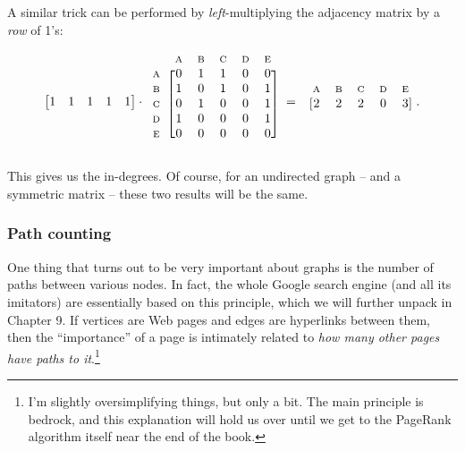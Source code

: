 \begin{alttitles}
A similar trick can be performed by \textit{left}-multiplying the adjacency
matrix by a \textit{row} of 1's:

\[
\begin{bmatrix}
1 & 1 & 1 & 1 & 1 \\
\end{bmatrix} \cdot
\begin{blockarray}{cccccc}
& {\scriptsize\textrm{A}} & {\scriptsize\textrm{B}} & {\scriptsize\textrm{C}} & {\scriptsize\textrm{D}} & {\scriptsize\textrm{E}} \\
\begin{block}{c[ccccc]}
{\scriptsize\textrm{A}} & 0 & 1 & 1 & 0 & 0 \\
{\scriptsize\textrm{B}} & 1 & 0 & 1 & 0 & 1 \\
{\scriptsize\textrm{C}} & 0 & 1 & 0 & 0 & 1 \\
{\scriptsize\textrm{D}} & 1 & 0 & 0 & 0 & 1 \\
{\scriptsize\textrm{E}} & 0 & 0 & 0 & 0 & 0 \\
\end{block}
\end{blockarray} \ =
\hspace*{-.1in}
\begin{blockarray}{cccccc}
& {\scriptsize\textrm{A}} & {\scriptsize\textrm{B}} & {\scriptsize\textrm{C}} & {\scriptsize\textrm{D}} & {\scriptsize\textrm{E}} \\
\begin{block}{c[ccccc]}
 & 2 & 2 & 2 & 0 & 3 \\
\end{block}
\end{blockarray}.
\]


This gives us the in-degrees. Of course, for an undirected graph -- and a
symmetric matrix -- these two results will be the same.


\subsubsection{Path counting}


One thing that turns out to be very important about graphs is the number of
paths between various nodes. In fact, the whole Google search engine (and all
its imitators) are essentially based on this principle, which we will further
unpack in Chapter 9. If vertices are Web pages and edges are hyperlinks between
them, then the ``importance'' of a page is intimately related to \textit{how
many other pages have paths to it}.\footnote{I'm slightly oversimplifying
things, but only a bit. The main principle is bedrock, and this explanation
will hold us over until we get to the PageRank algorithm itself near the end of
the book.}


\end{alttitles}

